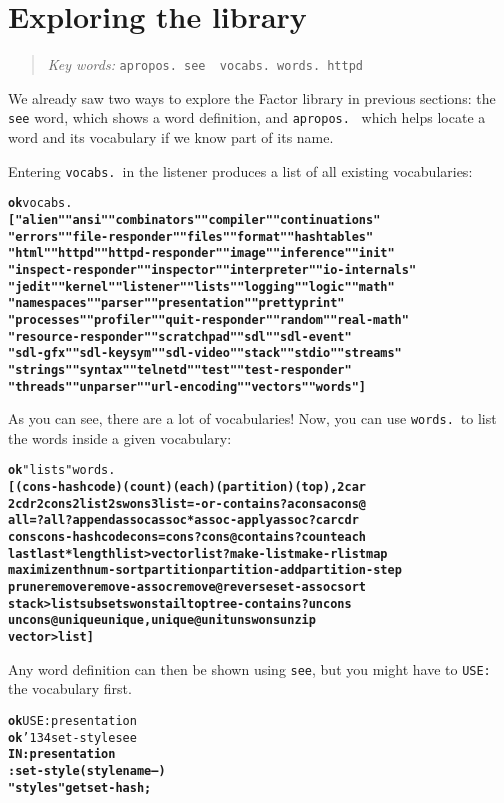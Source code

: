\documentclass[english]{book}
\newcommand{\ttbackslash}{\char'134}
\newcommand{\chapkeywords}[1]{%
\begin{quote}
\emph{Key words:} \texttt{#1}
\end{quote}
}
\begin{document}
\section{Exploring the library}

\chapkeywords{apropos.~see ~vocabs.~words.~httpd}

We already saw two ways to explore the Factor library in previous sections: the \texttt{see} word, which shows a word definition, and \texttt{apropos.}~ which helps locate a word and its vocabulary if we know part of its name.

Entering \texttt{vocabs.}~in the listener produces a list of all existing vocabularies:

\begin{alltt}
\textbf{ok} vocabs.
\textbf{[ "alien" "ansi" "combinators" "compiler" "continuations"
"errors" "file-responder" "files" "format" "hashtables"
"html" "httpd" "httpd-responder" "image" "inference" "init"
"inspect-responder" "inspector" "interpreter" "io-internals"
"jedit" "kernel" "listener" "lists" "logging" "logic" "math"
"namespaces" "parser" "presentation" "prettyprint"
"processes" "profiler" "quit-responder" "random" "real-math"
"resource-responder" "scratchpad" "sdl" "sdl-event"
"sdl-gfx" "sdl-keysym" "sdl-video" "stack" "stdio" "streams"
"strings" "syntax" "telnetd" "test" "test-responder"
"threads" "unparser" "url-encoding" "vectors" "words" ]
}
\end{alltt}

As you can see, there are a lot of vocabularies! Now, you can use \texttt{words.}~to list the words inside a given vocabulary:

\begin{alltt}
\textbf{ok} "lists" words.
\textbf{[ (cons-hashcode) (count) (each) (partition) (top) , 2car
2cdr 2cons 2list 2swons 3list =-or-contains? acons acons@
all=? all? append assoc assoc* assoc-apply assoc? car cdr
cons cons-hashcode cons= cons? cons@ contains? count each
last last* length list>vector list? make-list make-rlist map
maximize nth num-sort partition partition-add partition-step
prune remove remove-assoc remove@ reverse set-assoc sort
stack>list subset swons tail top tree-contains? uncons
uncons@ unique unique, unique@ unit unswons unzip
vector>list ]}
\end{alltt}

Any word definition can then be shown using \texttt{see}, but you might have to \texttt{USE:} the vocabulary first.

\begin{alltt}
\textbf{ok} USE: presentation
\textbf{ok} \ttbackslash set-style see
\textbf{IN: presentation
: set-style ( style name -- )
    "styles" get set-hash ;}
\end{alltt}
\end{document}
